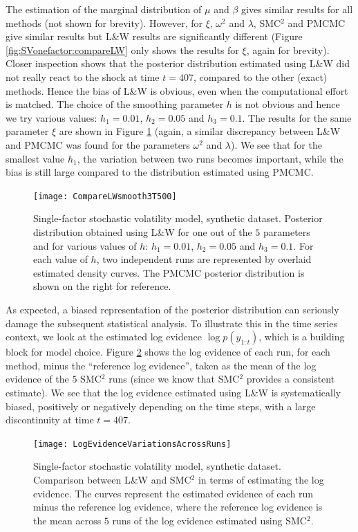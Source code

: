 \documentclass{statsoc}
\newcommand{\SMCSQ}{SMC$^2$\xspace}
\begin{document}
The estimation of the marginal distribution of $\mu$ and $\beta$ gives similar results for all methods (not shown for brevity).
However, for $\xi$, $\omega^2$ and $\lambda$, \SMCSQ and PMCMC give similar results but L\&W results are significantly different (Figure \ref{fig:SVonefactor:compareLW} only shows the results for $\xi$, again for brevity). Closer inspection shows that the posterior distribution estimated using L\&W did not really react to the shock at time $t = 407$, compared to the other (exact) methods. Hence the bias of L\&W is obvious, even when the computational effort is matched. The choice of the smoothing parameter $h$ is not obvious and hence we try various values: $h_1 = 0.01$, $h_2 = 0.05$ and $h_3 = 0.1$.
The results for the same parameter $\xi$ are shown in Figure \ref{fig:SVonefactor:compareLWsmoothing} (again, a similar
discrepancy between L\&W and PMCMC was found for the parameters $\omega^2$ and $\lambda$).
We see that for the smallest value $h_1$, the variation between two runs becomes important, while
the bias is still large compared to the distribution estimated using PMCMC.
\begin{figure}[H]
 \centering
  \texttt{[image: CompareLWsmooth3T500]}
 \caption{\label{fig:SVonefactor:compareLWsmoothing} Single-factor stochastic volatility model, synthetic dataset.
Posterior distribution obtained using L\&W for one out of the $5$ parameters and for various values of $h$: $h_1 = 0.01$, $h_2 = 0.05$ and $h_3 = 0.1$. For each value of $h$, two independent runs are represented by overlaid estimated density curves.
The PMCMC posterior distribution is shown on the right for reference.}
\end{figure}

As expected, a biased representation of the posterior distribution can seriously damage the subsequent
statistical analysis. To illustrate this in the time series context, we look at the estimated log evidence
$\log p(y_{1:t})$, which is a building block for model choice. Figure \ref{fig:SVonefactor:evidence} shows the log evidence of each run, for each method, 
minus the ``reference log evidence'', taken as the mean of the log evidence of the $5$ \SMCSQ runs (since we know that \SMCSQ provides a consistent estimate).
We see that the log evidence estimated using L\&W is systematically biased, positively or negatively depending on the time steps, with a large discontinuity at time $t = 407$.
\begin{figure}[H]
  \centering
  \texttt{[image: LogEvidenceVariationsAcrossRuns]}
  \caption{\label{fig:SVonefactor:evidence} Single-factor stochastic volatility model, synthetic dataset.
Comparison between L\&W and \SMCSQ in terms of estimating the log evidence. The curves represent 
the estimated evidence of each run minus the reference log evidence, where the reference log evidence is the
mean across $5$ runs of the log evidence estimated using \SMCSQ .
}
\end{figure}
\end{document}
